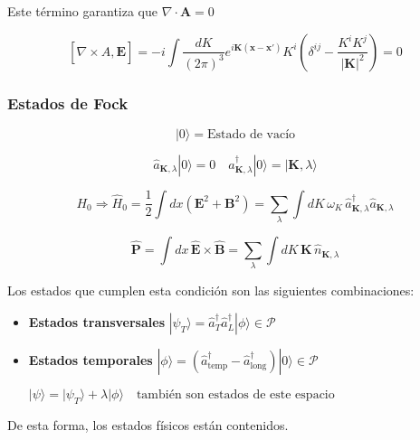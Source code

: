 Este término garantiza que $\nabla \cdot \mathbf{A} = 0$

$$
[\nabla \times \hat{A}, \mathbf{E}] = -i \int \frac{dK}{(2\pi)^3} e^{i \mathbf{K} (\mathbf{x} - \mathbf{x'})} K^i \left(\delta^{ij} - \frac{K^i K^j}{|\mathbf{K}|^2}\right) = 0
$$

\subsubsection{Estados de Fock}

$$
|0\rangle = \text{Estado de vacío} 
$$

$$
\hat{a}_{\mathbf{K},\lambda} |0\rangle = 0 \quad \hat{a}^\dagger_{\mathbf{K},\lambda} |0\rangle = |\mathbf{K}, \lambda \rangle 
$$

$$
H_0 \Rightarrow \hat{H}_0 = \frac{1}{2} \int dx (\mathbf{E}^2 + \mathbf{B}^2) = \sum_\lambda \int dK \, \omega_K \, \hat{a}^\dagger_{\mathbf{K},\lambda} \hat{a}_{\mathbf{K},\lambda}
$$

$$
\hat{\mathbf{P}} = \int dx \, \hat{\mathbf{E}} \times \hat{\mathbf{B}} = \sum_\lambda \int dK \, \mathbf{K} \, \hat{n}_{\mathbf{K},\lambda}
$$

Los estados que cumplen esta condición son las siguientes combinaciones:

\begin{itemize}
    \item \textbf{Estados transversales}
    $
    |\psi_T\rangle = \hat{a}^\dagger_T \hat{a}^\dagger_L |\phi\rangle \in \mathcal{P}
    $

    \item \textbf{Estados temporales}
    $
    |\phi\rangle = (\hat{a}^\dagger_\text{temp} - \hat{a}^\dagger_\text{long}) |0\rangle \in \mathcal{P}
    $

    $
    |\psi\rangle = |\psi_T\rangle + \lambda |\phi\rangle \quad \text{también son estados de este espacio}
    $
\end{itemize}

De esta forma, los estados físicos están contenidos.